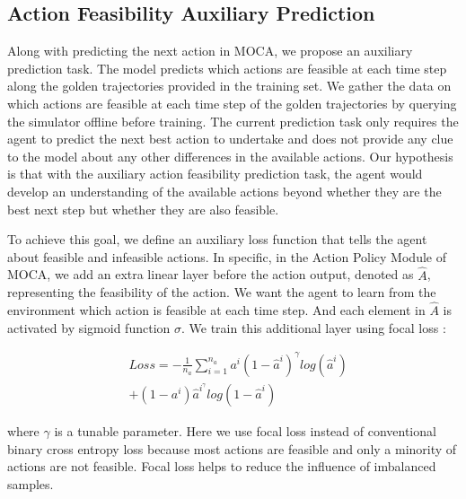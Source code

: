 \documentclass[11pt,a4paper]{article}
\begin{document}
\subsection{Action Feasibility Auxiliary Prediction}
Along with predicting the next action in MOCA, we propose an auxiliary prediction task. The model predicts which actions are feasible at each time step along the golden trajectories provided in the training set. 
We gather the data on which actions are feasible at each time step of the golden trajectories by querying the simulator offline before training. 
The current prediction task only requires the agent to predict the next best action to undertake and does not provide any clue to the model about any other differences in the available actions. Our hypothesis is that with the auxiliary action feasibility prediction task, the agent would develop an understanding of the available actions beyond whether they are the best next step but whether they are also feasible.

To achieve this goal, we define an auxiliary loss function that tells the agent about feasible and infeasible actions. In specific, in the Action Policy Module of MOCA, we add an extra linear layer before the action output, denoted as $\hat{A}$, representing the feasibility of the action. We want the agent to learn from the environment which action is feasible at each time step. And each element in $\hat{A}$ is activated by sigmoid function $\sigma$. We train this additional layer using focal loss \cite{lin2017focal}:

\begin{equation}
\begin{split}
    & Loss = -\frac{1}{n_a} \sum_{i=1}^{n_a} a^{i} (1 - \hat{a}^{i})^{\gamma} log (\hat{a}^{i}) \\
    & + (1 - a^{i}) \hat{a}^{i}^{\gamma} log (1 - \hat{a}^{i})
\end{split}
\end{equation}

where $\gamma$ is a tunable parameter. Here we use focal loss instead of conventional binary cross entropy loss because most actions are feasible and only a minority of actions are not feasible. Focal loss helps to reduce the influence of imbalanced samples.

\end{document}
